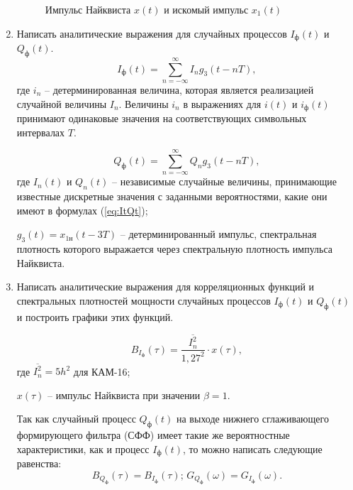 \documentclass[a4paper, 12pt]{article}
\begin{document}
\begin{enumerate}
\begin{figure}[H]
    \caption{Импульс Найквиста $x(t)$ и искомый импульс $x_1(t)$}
  \end{figure}
  \item Написать аналитические выражения для случайных процессов 
  $I_ф(t)$ и $Q_ф(t)$.
  \[ I_ф(t)=\sum^\infty_{n=-\infty}I_ng_3(t-nT), \]
  где $i_n$ -- детерминированная величина, которая является 
  реализацией случайной величины $I_n$. 
  Величины $i_n$ в выражениях для $i(t)$ и $i_ф(t)$ 
  принимают одинаковые значения на соответствующих символьных 
  интервалах $T$.

  \[ Q_ф(t)=\sum^\infty_{n=-\infty}Q_ng_3(t-nT), \]
  где $I_n(t)$ и $Q_n(t)$ -- независимые случайные величины, 
  принимающие известные дискретные значения с заданными 
  вероятностями, какие они имеют в формулах (\ref{eq:ItQt});

  $g_3(t)=x_{1н}(t-3T)$ -- детерминированный импульс,
  спектральная плотность которого выражается через спектральную 
  плотность импульса Найквиста.

  \item Написать аналитические выражения для корреляционных функций
  и спектральных плотностей мощности случайных процессов 
  $I_ф(t)$ и $Q_ф(t)$ и построить графики этих функций.

  \begin{equation}
    B_{I_ф}(\tau)=\frac{\overline{I_n^2}}{1,27^2}\cdot x(\tau),
  \end{equation}
  где $\overline{I^2_n}=5h^2$ для КАМ-16;

  $x(\tau)$ -- импульс Найквиста при значении $\beta=1$.

  Так как случайный процесс $Q_ф(t)$ на выходе нижнего сглаживающего 
  формирующего фильтра (СФФ) имеет такие же вероятностные 
  характеристики, как и процесс $I_ф(t)$, то можно написать 
  следующие равенства:
  \begin{equation}
      B_{Q_ф}(\tau)=B_{I_ф}(\tau);\,
      G_{Q_ф}(\omega)=G_{I_ф}(\omega).
  \end{equation}
  \begin{figure}[H]
    \centering
\end{figure}
\end{enumerate}
\end{document}
